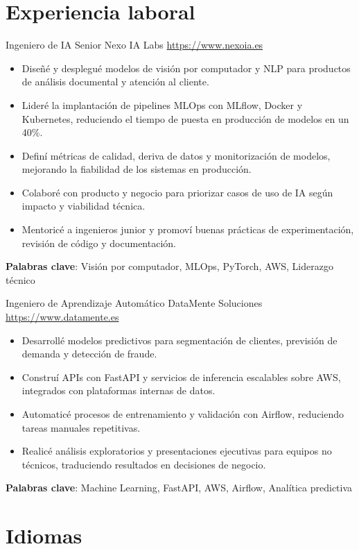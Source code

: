 \documentclass[a4paper, serif, 10pt]{moderncv}
\begin{document}
\section{Experiencia laboral}

        {Ingeniero de IA Senior}
        {Nexo IA Labs}
        {\url{https://www.nexoia.es}}
        {}
        {\begin{itemize}
\item Diseñé y desplegué modelos de visión por computador y NLP para productos de análisis documental y atención al cliente.
\item Lideré la implantación de pipelines MLOps con MLflow, Docker y Kubernetes, reduciendo el tiempo de puesta en producción de modelos en un 40\%.
\item Definí métricas de calidad, deriva de datos y monitorización de modelos, mejorando la fiabilidad de los sistemas en producción.
\item Colaboré con producto y negocio para priorizar casos de uso de IA según impacto y viabilidad técnica.
\item Mentoricé a ingenieros junior y promoví buenas prácticas de experimentación, revisión de código y documentación.
\end{itemize}
\textbf{Palabras clave}: Visión por computador, MLOps, PyTorch, AWS, Liderazgo técnico}

        {Ingeniero de Aprendizaje Automático}
        {DataMente Soluciones}
        {\url{https://www.datamente.es}}
        {}
        {\begin{itemize}
\item Desarrollé modelos predictivos para segmentación de clientes, previsión de demanda y detección de fraude.
\item Construí APIs con FastAPI y servicios de inferencia escalables sobre AWS, integrados con plataformas internas de datos.
\item Automaticé procesos de entrenamiento y validación con Airflow, reduciendo tareas manuales repetitivas.
\item Realicé análisis exploratorios y presentaciones ejecutivas para equipos no técnicos, traduciendo resultados en decisiones de negocio.
\end{itemize}
\textbf{Palabras clave}: Machine Learning, FastAPI, AWS, Airflow, Analítica predictiva}
\section{Idiomas}
\end{document}
